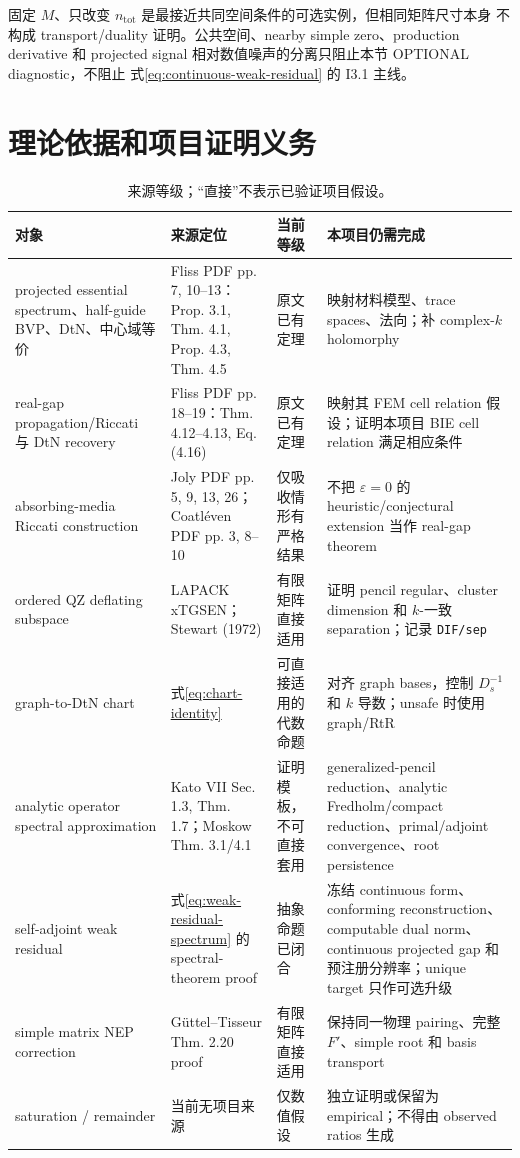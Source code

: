 \documentclass[UTF8,fontset=fandol,11pt,a4paper]{ctexart}
\begin{document}
固定 $M$、只改变 $n_{\mathrm{tot}}$ 是最接近共同空间条件的可选实例，但相同矩阵尺寸本身
不构成 transport/duality 证明。公共空间、nearby simple zero、production derivative 和
projected signal 相对数值噪声的分离只阻止本节 OPTIONAL diagnostic，不阻止
式\eqref{eq:continuous-weak-residual} 的 I3.1 主线。

\section{理论依据和项目证明义务}

\begin{table}[htbp]
  \centering
  \footnotesize
  \caption{来源等级；“直接”不表示已验证项目假设。}
  \begin{tabular}{p{}p{}p{}p{}}
    \toprule
    对象 & 来源定位 & 当前等级 & 本项目仍需完成 \\
    \midrule
    projected essential spectrum、half-guide BVP、DtN、中心域等价 & Fliss PDF pp. 7, 10--13：Prop. 3.1, Thm. 4.1, Prop. 4.3, Thm. 4.5 & 原文已有定理 & 映射材料模型、trace spaces、法向；补 complex-$k$ holomorphy \\
    real-gap propagation/Riccati 与 DtN recovery & Fliss PDF pp. 18--19：Thm. 4.12--4.13, Eq. (4.16) & 原文已有定理 & 映射其 FEM cell relation 假设；证明本项目 BIE cell relation 满足相应条件 \\
    absorbing-media Riccati construction & Joly PDF pp. 5, 9, 13, 26；Coatl\'even PDF pp. 3, 8--10\cite{Joly2006,Coatleven2012} & 仅吸收情形有严格结果 & 不把 $\varepsilon=0$ 的 heuristic/conjectural extension 当作 real-gap theorem \\
    ordered QZ deflating subspace & LAPACK xTGSEN；Stewart (1972) & 有限矩阵直接适用 & 证明 pencil regular、cluster dimension 和 $k$-一致 separation；记录 \texttt{DIF/sep} \\
    graph-to-DtN chart & 式\eqref{eq:chart-identity} & 可直接适用的代数命题 & 对齐 graph bases，控制 $D_s^{-1}$ 和 $k$ 导数；unsafe 时使用 graph/RtR \\
    analytic operator spectral approximation & Kato VII Sec. 1.3, Thm. 1.7；Moskow Thm. 3.1/4.1 & 证明模板，不可直接套用 & generalized-pencil reduction、analytic Fredholm/compact reduction、primal/adjoint convergence、root persistence \\
    self-adjoint weak residual & 式\eqref{eq:weak-residual-spectrum} 的 spectral-theorem proof & 抽象命题已闭合 & 冻结 continuous form、conforming reconstruction、computable dual norm、continuous projected gap 和预注册分辨率；unique target 只作可选升级 \\
    simple matrix NEP correction & G\"uttel--Tisseur Thm. 2.20 proof & 有限矩阵直接适用 & 保持同一物理 pairing、完整 $F'$、simple root 和 basis transport \\
    saturation / remainder & 当前无项目来源 & 仅数值假设 & 独立证明或保留为 empirical；不得由 observed ratios 生成 \\
    \bottomrule
  \end{tabular}
\end{table}
\end{document}
